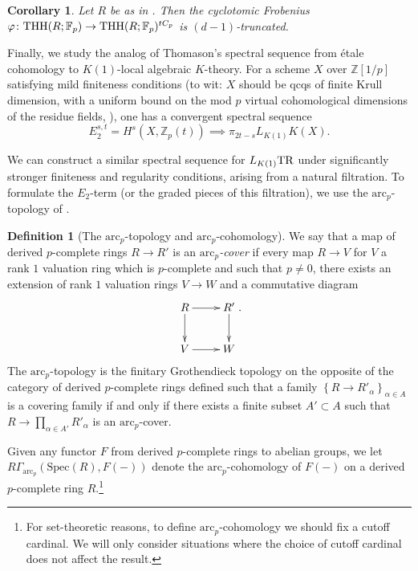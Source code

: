 \documentclass{amsart}
\newtheorem{corollary}[theorem]{Corollary}
\theoremstyle{definition}
\newcommand{\spec}{\mathrm{Spec}}
\newtheorem{definition}[theorem]{Definition}
\begin{document}
\begin{corollary} 
Let $R$ be as in 
. Then the cyclotomic Frobenius $\varphi \colon\mathrm{THH}(R; \mathbb{F}_p) \to
\mathrm{THH}(R; \mathbb{F}_p)^{tC_p}$ is $(d-1)$-truncated. 
\end{corollary} 


\newcommand{\arc}{\mathrm{arc}_{{p}}}

Finally, we study the analog of Thomason's spectral sequence \cite{Tho85, TT90}
from \'etale cohomology to $K(1)$-local algebraic $K$-theory. 
For a scheme $X$ over $\mathbb{Z}[1/p]$ satisfying mild finiteness conditions
(to wit: $X$ should be qcqs of finite Krull dimension, with a uniform bound on
the mod $p$ virtual cohomological dimensions of the residue fields,
\cite{RO06, CM19}), one has a convergent spectral sequence
\[ E_2^{s,t} =H^s(X, \mathbb{Z}_p(t)) \implies \pi_{2t-s} L_{K(1)} K(X).  \]

We can construct a similar spectral sequence for $L_{K(1)} \mathrm{TR}$ under
significantly stronger finiteness and regularity
conditions, arising from a natural filtration. 
To formulate the $E_2$-term (or the graded pieces of this filtration), we use the $\arc$-topology of \cite{BM18}. 

\begin{definition}[The $\arc$-topology and $\arc$-cohomology] 
\label{arcpdefinitionintro}
We say that a map of derived $p$-complete rings $R \to R'$ is an \emph{$\arc$-cover} if 
every map $R \to V$ for $V$ a rank $1$ valuation ring  which is $p$-complete and such that $p \neq 0$,
there exists an extension of rank $1$ valuation rings $V \to W$ and a
commutative diagram
\[ \xymatrix{
R \ar[d]  \ar[r] &  R' \ar[d]  \\
V \ar[r] &  W 
}.\]
The $\arc$-topology is the finitary 
Grothendieck topology on the opposite of the category of derived
$p$-complete rings defined such that a family $\left\{R \to R'_\alpha\right\}_{\alpha \in A}$ is a
covering family if and only if there exists a finite subset $A' \subset A$ such
that $R \to \prod_{\alpha \in A'} R'_\alpha$ is an $\arc$-cover. 

Given any functor $F$
from derived $p$-complete rings to abelian groups, 
we let $R \Gamma_{\arc}( \spec(R), F(-))$ denote the $\arc$-cohomology of $F(-)$
on a derived $p$-complete ring $R$.\footnote{For set-theoretic reasons, to define $\arc$-cohomology
we should fix a cutoff cardinal. We will only consider situations where the
choice of cutoff cardinal does not affect the result.} 
\end{definition} 
\end{document}
